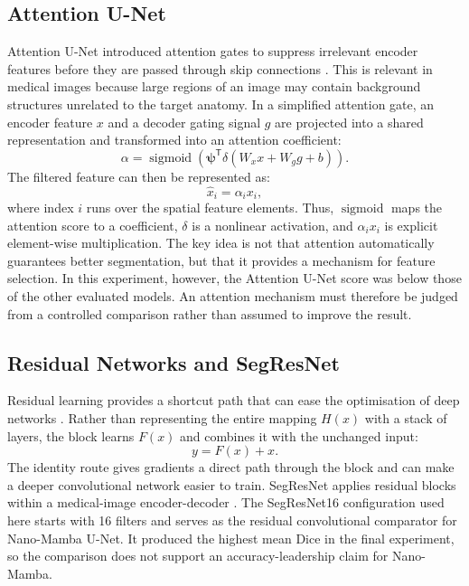 \subsection{Attention U-Net}
Attention U-Net introduced attention gates to suppress irrelevant encoder features before they are passed through skip connections \citep{oktay2018attention}. This is relevant in medical images because large regions of an image may contain background structures unrelated to the target anatomy. In a simplified attention gate, an encoder feature $x$ and a decoder gating signal $g$ are projected into a shared representation and transformed into an attention coefficient:
\begin{equation}
    \alpha = \operatorname{sigmoid}\!\left(
      \boldsymbol{\psi}^{\mathsf{T}}
      \delta\!\left(W_xx + W_gg + b\right)
    \right).
\end{equation}
The filtered feature can then be represented as:
\begin{equation}
    \hat{x}_i=\alpha_i x_i,
\end{equation}
where index \(i\) runs over the spatial feature elements. Thus,
\(\operatorname{sigmoid}\) maps the attention score to a coefficient,
\(\delta\) is a nonlinear activation, and \(\alpha_i x_i\) is explicit
element-wise multiplication. The key idea is not that attention automatically
guarantees better segmentation, but that it provides a mechanism for feature
selection. In this experiment, however, the Attention U-Net score was below
those of the other evaluated models. An attention mechanism must therefore be
judged from a controlled comparison rather than assumed to improve the result.

\subsection{Residual Networks and SegResNet}
Residual learning provides a shortcut path that can ease the optimisation of deep networks \citep{he2016deep}. Rather than representing the entire mapping $H(x)$ with a stack of layers, the block learns $F(x)$ and combines it with the unchanged input:
\begin{equation}
    y = F(x) + x.
\end{equation}
The identity route gives gradients a direct path through the block and can make a deeper convolutional network easier to train. SegResNet applies residual blocks within a medical-image encoder-decoder \citep{myronenko2019segresnet}. The SegResNet16 configuration used here starts with 16 filters and serves as the residual convolutional comparator for Nano-Mamba U-Net. It produced the highest mean Dice in the final experiment, so the comparison does not support an accuracy-leadership claim for Nano-Mamba.


